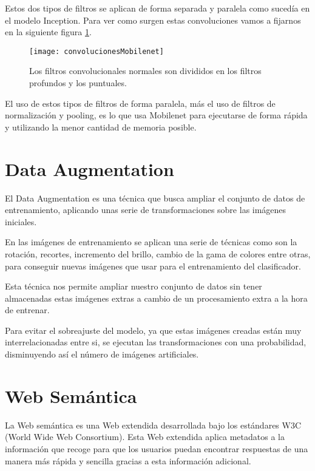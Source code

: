 Estos dos tipos de filtros se aplican de forma separada y paralela como sucedía en el modelo Inception. Para ver como surgen estas convoluciones vamos a fijarnos en la siguiente figura \ref{figconvolucionesMobilenet}.

\begin{figure}[h]
    \begin{center}%
        \begin{center}%
          \texttt{[image: convolucionesMobilenet]}%
          \caption{Los filtros convolucionales normales son divididos en los filtros profundos y los puntuales.}%
          \label{figconvolucionesMobilenet}%
        \end{center}%
  	\end{center}%
\end{figure}%

El uso de estos tipos de filtros de forma paralela, más el uso de filtros de normalización y pooling, es lo que usa Mobilenet para ejecutarse de forma rápida y utilizando la menor cantidad de memoria posible.

\section{Data Augmentation}

	El Data Augmentation es una técnica que busca ampliar el conjunto de datos de entrenamiento, aplicando unas serie de transformaciones sobre las imágenes iniciales. \cite{NIPS2012_4824}
	
En las imágenes de entrenamiento se aplican una serie de técnicas como son la rotación, recortes, incremento del brillo, cambio de la gama de colores  entre otras, para conseguir nuevas imágenes que usar para el entrenamiento del clasificador.

Esta técnica nos permite ampliar nuestro conjunto de datos sin tener almacenadas estas imágenes extras a cambio de un procesamiento extra a la hora de entrenar.

Para evitar el sobreajuste del modelo, ya que estas imágenes creadas están muy interrelacionadas entre si, se ejecutan las transformaciones con una probabilidad, disminuyendo así el número de imágenes artificiales.


\section{Web Semántica}

La Web semántica es una Web extendida desarrollada bajo los estándares W3C (World Wide Web Consortium). Esta Web extendida aplica metadatos a la información que recoge para que los usuarios puedan encontrar respuestas de una manera más rápida y sencilla gracias a esta información adicional.\cite{webSemantica} 

